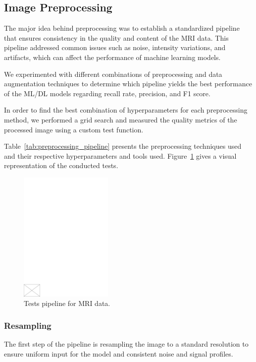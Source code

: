 %
\subsection{Image Preprocessing}

The major idea behind preprocessing was to establish a standardized pipeline that ensures consistency in the quality and content of the MRI data. This pipeline addressed common issues such as noise, intensity variations, and artifacts, which can affect the performance of machine learning models.

We experimented with different combinations of preprocessing and data augmentation techniques to determine which pipeline yields the best performance of the ML/DL models regarding recall rate, precision, and F1 score.

In order to find the best combination of hyperparameters for each preprocessing method, we performed a grid search and measured the quality metrics of the processed image using a custom test function.

Table~\ref{tab:preprocessing_pipeline} presents the preprocessing techniques used and their respective hyperparameters and tools used. Figure~\ref{fig:test_pipeline} gives a visual representation of the conducted tests.
%
\begin{figure}[h]
    \centering
    \includegraphics[width=0.4\textwidth]{./figs/empty.pdf} %
    \caption{Tests pipeline for MRI data.}\label{fig:test_pipeline}
\end{figure}

\subsubsection{Resampling}

The first step of the pipeline is resampling the image to a standard resolution to ensure uniform input for the model and consistent noise and signal profiles.

